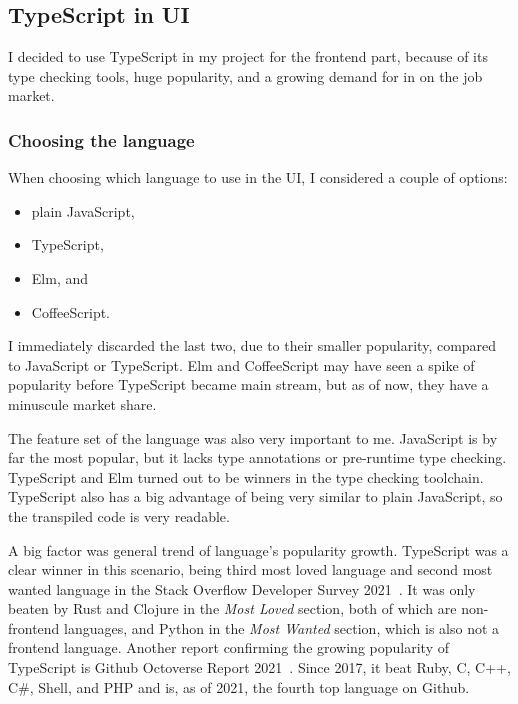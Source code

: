 \subsection{TypeScript in UI}\label{sec:typescript-in-ui}

I decided to use TypeScript in my project for the frontend part,
because of its type checking tools,
huge popularity,
and a growing demand for in on the job market.

\subsubsection{Choosing the language}\label{sec:choosing-the-language}

When choosing which language to use in the UI,
I considered a couple of options:

\begin{itemize}
      \item
            plain JavaScript,
      \item
            TypeScript,
      \item
            Elm, and
      \item
            CoffeeScript.
\end{itemize}

I immediately discarded the last two,
due to their smaller popularity,
compared to JavaScript or TypeScript.
Elm and CoffeeScript may have seen
a spike of popularity before TypeScript
became main stream,
but as of now, they have a minuscule market share.

The feature set of the language was also very important to me.
JavaScript is by far the most popular,
but it lacks type annotations or pre-runtime type checking.
TypeScript and Elm turned out to be winners in the type checking toolchain.
TypeScript also has a big advantage of being very similar to plain JavaScript,
so the transpiled code is very readable.

A big factor was general trend of language's popularity growth.
TypeScript was a clear winner in this scenario,
being third most loved language
and second most wanted language
in the Stack Overflow Developer Survey 2021~\cite{stack_overflow_2021_2021}.
It was only beaten by Rust and Clojure
in the \textit{Most Loved} section,
both of which are non-frontend languages,
and Python in the \textit{Most Wanted} section,
which is also not a frontend language.
Another report confirming the growing popularity of TypeScript
is Github Octoverse Report 2021~\cite{github_inc_2021_2021}.
Since 2017,
it beat
Ruby,
C,
C++,
C\#,
Shell, and
PHP
and is, as of 2021, the fourth top language on Github.

